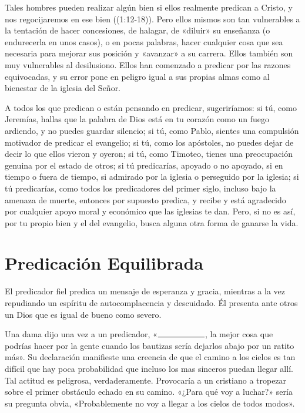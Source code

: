 \documentclass[12pt, twoside, openright]{book}
\begin{document}
Tales hombres pueden realizar algún bien si ellos realmente predican a Cristo, y nos regocijaremos en ese bien ((1:12-18)). Pero ellos mismos son tan vulnerables a la tentación de hacer concesiones, de halagar, de «diluir» su enseñanza (o endurecerla en unos casos), o en pocas palabras, hacer cualquier cosa que sea necesaria para mejorar sus posición y «avanzar» a su carrera. Ellos también son muy vulnerables al desilusiono. Ellos han comenzado a predicar por las razones equivocadas, y su error pone en peligro igual a sus propias almas como al bienestar de la iglesia del Señor.

A todos los que predican o están pensando en predicar, sugeriríamos: si tú, como Jeremías, hallas que la palabra de Dios está en tu corazón como un fuego ardiendo, y no puedes guardar silencio; si tú, como Pablo, sientes una compulsión motivador de predicar el evangelio; si tú, como los apóstoles, no puedes dejar de decir lo que ellos vieron y oyeron; si tú, como Timoteo, tienes una preocupación genuina por el estado de otros; si tú predicarías, apoyado o no apoyado, si en tiempo o fuera de tiempo, si admirado por la iglesia o perseguido por la iglesia; si tú predicarías, como todos los predicadores del primer siglo, incluso bajo la amenaza de muerte, entonces por supuesto predica, y recibe y está agradecido por cualquier apoyo moral y económico que las iglesias te dan. Pero, si no es así, por tu propio bien y el del evangelio, busca alguna otra forma de ganarse la vida. 

\section{Predicación Equilibrada}
El predicador fiel predica un mensaje de esperanza y gracia, mientras a la vez repudiando un espíritu de autocomplacencia y descuidado. Él presenta ante otros un Dios que es igual de bueno como severo. 

Una dama dijo una vez a un predicador, «$\rule{2cm}{0.15mm}$, la mejor cosa que podrías hacer por la gente cuando los bautizas sería dejarlos abajo por un ratito más». Su declaración manifieste una creencia de que el camino a los cielos es tan difícil que hay poca probabilidad que incluso los mas sinceros puedan llegar allí. Tal actitud es peligrosa, verdaderamente. Provocaría a un cristiano a tropezar sobre el primer obstáculo echado en su camino. «¿Para qué voy a luchar?» sería su pregunta obvia, «Probablemente no voy a llegar a los cielos de todos modos».
\end{document}

